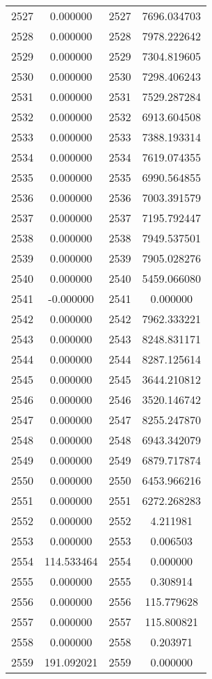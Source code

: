 \documentclass[12pt]{article}
\begin{document}
\begin{longtable}{@{}cccc@{}}
2527 & 0.000000 & 2527 & 7696.034703 \\
2528 & 0.000000 & 2528 & 7978.222642 \\
2529 & 0.000000 & 2529 & 7304.819605 \\
2530 & 0.000000 & 2530 & 7298.406243 \\
2531 & 0.000000 & 2531 & 7529.287284 \\
2532 & 0.000000 & 2532 & 6913.604508 \\
2533 & 0.000000 & 2533 & 7388.193314 \\
2534 & 0.000000 & 2534 & 7619.074355 \\
2535 & 0.000000 & 2535 & 6990.564855 \\
2536 & 0.000000 & 2536 & 7003.391579 \\
2537 & 0.000000 & 2537 & 7195.792447 \\
2538 & 0.000000 & 2538 & 7949.537501 \\
2539 & 0.000000 & 2539 & 7905.028276 \\
2540 & 0.000000 & 2540 & 5459.066080 \\
2541 & -0.000000 & 2541 & 0.000000 \\
2542 & 0.000000 & 2542 & 7962.333221 \\
2543 & 0.000000 & 2543 & 8248.831171 \\
2544 & 0.000000 & 2544 & 8287.125614 \\
2545 & 0.000000 & 2545 & 3644.210812 \\
2546 & 0.000000 & 2546 & 3520.146742 \\
2547 & 0.000000 & 2547 & 8255.247870 \\
2548 & 0.000000 & 2548 & 6943.342079 \\
2549 & 0.000000 & 2549 & 6879.717874 \\
2550 & 0.000000 & 2550 & 6453.966216 \\
2551 & 0.000000 & 2551 & 6272.268283 \\
2552 & 0.000000 & 2552 & 4.211981 \\
2553 & 0.000000 & 2553 & 0.006503 \\
2554 & 114.533464 & 2554 & 0.000000 \\
2555 & 0.000000 & 2555 & 0.308914 \\
2556 & 0.000000 & 2556 & 115.779628 \\
2557 & 0.000000 & 2557 & 115.800821 \\
2558 & 0.000000 & 2558 & 0.203971 \\
2559 & 191.092021 & 2559 & 0.000000 \\

\end{longtable}
\end{document}
